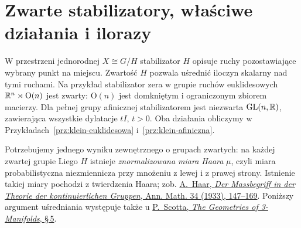 \section{Zwarte stabilizatory, właściwe działania i ilorazy}
\label{sec:klein-zwarte-stabilizatory}

W przestrzeni jednorodnej $X\cong G/H$ stabilizator $H$
opisuje ruchy pozostawiające wybrany punkt na miejscu.
Zwartość $H$ pozwala uśrednić iloczyn skalarny nad tymi ruchami.
Na przykład stabilizator zera w grupie ruchów euklidesowych
$\mathbb{R}^n\rtimes\mathrm O(n)$ jest zwarty: $\mathrm O(n)$ jest
domkniętym i ograniczonym zbiorem macierzy. Dla pełnej grupy
afinicznej stabilizatorem jest niezwarta $\mathrm{GL}(n,\mathbb{R})$,
zawierająca wszystkie dylatacje $tI$, $t>0$.
Oba działania obliczymy w
Przykładach~\ref{prz:klein-euklidesowa}
i~\ref{prz:klein-afiniczna}.

Potrzebujemy jednego wyniku zewnętrznego o grupach zwartych:
na każdej zwartej grupie Liego $H$ istnieje \emph{znormalizowana
miara Haara} $\mu$, czyli miara probabilistyczna niezmiennicza
przy mnożeniu z lewej i z prawej strony. Istnienie takiej miary
pochodzi z twierdzenia Haara; zob.
\href{https://doi.org/10.2307/1968346}
{A.\ Haar, \emph{Der Massbegriff in der Theorie der kontinuierlichen
Gruppen}, Ann. Math. 34 (1933), 147--169}.
Poniższy argument uśredniania występuje także u
\href{https://sschleimer.warwick.ac.uk/Teach/2021_3MFDS/References/1983the_geometries_of_three-manifolds.pdf}
{P.\ Scotta, \emph{The Geometries of 3-Manifolds}, \S\,5}.

